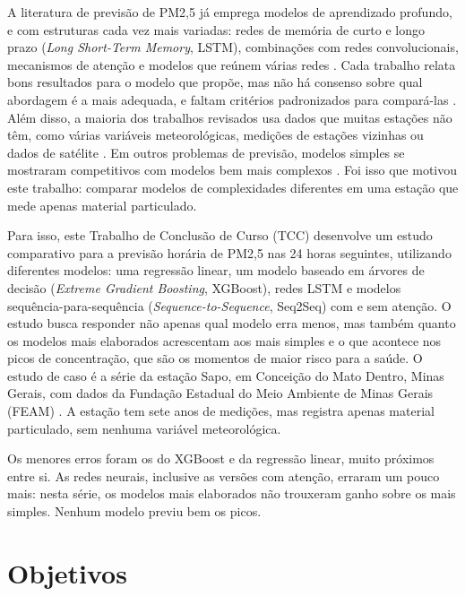 A literatura de previsão de PM2,5 já emprega modelos de aprendizado profundo, e com estruturas cada vez mais variadas: redes de memória de curto e longo prazo (\textit{Long Short-Term Memory}, LSTM), combinações com redes convolucionais, mecanismos de atenção e modelos que reúnem várias redes \cite{li2020urban,yang2023attention,su2023cnn_lstm_pm25}. Cada trabalho relata bons resultados para o modelo que propõe, mas não há consenso sobre qual abordagem é a mais adequada, e faltam critérios padronizados para compará-las \cite{pm25_review_2024}. Além disso, a maioria dos trabalhos revisados usa dados que muitas estações não têm, como várias variáveis meteorológicas, medições de estações vizinhas ou dados de satélite \cite{li2020urban,tran2023optimized_lstm,chen2024lstcn_pm25,zanobini2024curitiba}. Em outros problemas de previsão, modelos simples se mostraram competitivos com modelos bem mais complexos \cite{zeng2023transformers,hewamalage2021rnn}. Foi isso que motivou este trabalho: comparar modelos de complexidades diferentes em uma estação que mede apenas material particulado.

Para isso, este Trabalho de Conclusão de Curso (TCC) desenvolve um estudo comparativo para a previsão horária de PM2,5 nas 24 horas seguintes, utilizando diferentes modelos: uma regressão linear, um modelo baseado em árvores de decisão (\textit{Extreme Gradient Boosting}, XGBoost), redes LSTM e modelos sequência-para-sequência (\textit{Sequence-to-Sequence}, Seq2Seq) com e sem atenção. O estudo busca responder não apenas qual modelo erra menos, mas também quanto os modelos mais elaborados acrescentam aos mais simples e o que acontece nos picos de concentração, que são os momentos de maior risco para a saúde. O estudo de caso é a série da estação Sapo, em Conceição do Mato Dentro, Minas Gerais, com dados da Fundação Estadual do Meio Ambiente de Minas Gerais (FEAM) \cite{feam2026dadosmonitoramento}. A estação tem sete anos de medições, mas registra apenas material particulado, sem nenhuma variável meteorológica.

Os menores erros foram os do XGBoost e da regressão linear, muito próximos entre si. As redes neurais, inclusive as versões com atenção, erraram um pouco mais: nesta série, os modelos mais elaborados não trouxeram ganho sobre os mais simples. Nenhum modelo previu bem os picos.

\section{Objetivos}
\label{sec:objetivos}

